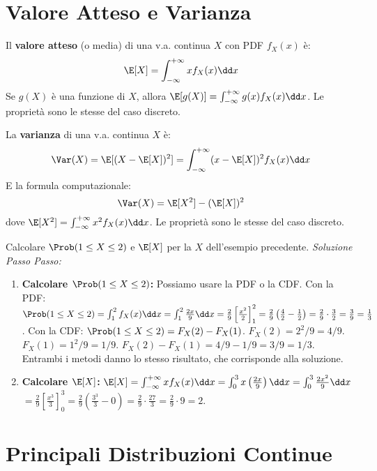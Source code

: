 \section{Valore Atteso e Varianza}
\begin{definition}
Il \textbf{valore atteso} (o media) di una v.a. continua $X$ con PDF $f_X(x)$ è:
\[ \E[X] = \int_{-\infty}^{+\infty} x f_X(x) \dd x \]
Se $g(X)$ è una funzione di $X$, allora $\E[g(X)] = \int_{-\infty}^{+\infty} g(x) f_X(x) \dd x$.
Le proprietà sono le stesse del caso discreto.
\end{definition}

\begin{definition}[Varianza]
La \textbf{varianza} di una v.a. continua $X$ è:
\[ \Var(X) = \E[(X - \E[X])^2] = \int_{-\infty}^{+\infty} (x - \E[X])^2 f_X(x) \dd x \]
E la formula computazionale:
\[ \Var(X) = \E[X^2] - (\E[X])^2 \]
dove $\E[X^2] = \int_{-\infty}^{+\infty} x^2 f_X(x) \dd x$.
Le proprietà sono le stesse del caso discreto.
\end{definition}

\begin{example}
Calcolare $\Prob(1 \le X \le 2)$ e $\E[X]$ per la $X$ dell'esempio precedente.
\textit{Soluzione Passo Passo:}
\begin{enumerate}
    \item \textbf{Calcolare $\Prob(1 \le X \le 2)$:}
    Possiamo usare la PDF o la CDF.
    Con la PDF: $\Prob(1 \le X \le 2) = \int_1^2 f_X(x) \dd x = \int_1^2 \frac{2x}{9} \dd x = \frac{2}{9} \left[ \frac{x^2}{2} \right]_1^2 = \frac{2}{9} \left( \frac{4}{2} - \frac{1}{2} \right) = \frac{2}{9} \cdot \frac{3}{2} = \frac{3}{9} = \frac{1}{3}$.
    Con la CDF: $\Prob(1 \le X \le 2) = F_X(2) - F_X(1)$.
    $F_X(2) = 2^2/9 = 4/9$.
    $F_X(1) = 1^2/9 = 1/9$.
    $F_X(2) - F_X(1) = 4/9 - 1/9 = 3/9 = 1/3$.
    Entrambi i metodi danno lo stesso risultato, che corrisponde alla soluzione.
    \item \textbf{Calcolare $\E[X]$:}
    $\E[X] = \int_{-\infty}^{+\infty} x f_X(x) \dd x = \int_0^3 x \left(\frac{2x}{9}\right) \dd x = \int_0^3 \frac{2x^2}{9} \dd x$
    $= \frac{2}{9} \left[ \frac{x^3}{3} \right]_0^3 = \frac{2}{9} \left( \frac{3^3}{3} - 0 \right) = \frac{2}{9} \cdot \frac{27}{3} = \frac{2}{9} \cdot 9 = 2$.
\end{enumerate}
\end{example}

\section{Principali Distribuzioni Continue}


